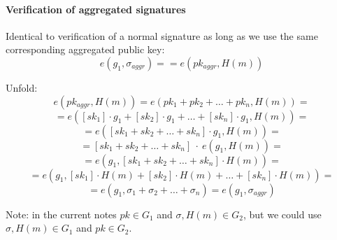 \documentclass{article}
\theoremstyle{definition}
\begin{document}
\paragraph{Verification of aggregated signatures}
Identical to verification of a normal signature as long as we use the same corresponding aggregated public key:
$$e(g_1, \sigma_{aggr})==e(pk_{aggr}, H(m))$$

Unfold:
$$e(pk_{aggr}, H(m))= e(pk_1 + pk_2 + \ldots + pk_n, H(m)) =$$
$$=e([sk_1] \cdot g_1 + [sk_2] \cdot g_1 + \ldots + [sk_n] \cdot g_1, H(m))=$$
$$=e([sk_1 + sk_2 + \ldots + sk_n] \cdot g_1, H(m))=$$
$$=[sk_1 + sk_2 + \ldots + sk_n]~\cdot~e(g_1, H(m))=$$
$$=e(g_1, [sk_1 + sk_2 + \ldots + sk_n] \cdot H(m))=$$
$$=e(g_1, [sk_1] \cdot H(m) + [sk_2] \cdot H(m) + \ldots + [sk_n] \cdot H(m))=$$
$$=e(g_1, \sigma_1 + \sigma_2 + \ldots + \sigma_n)= e(g_1, \sigma_{aggr})$$


Note: in the current notes $pk \in G_1$ and $\sigma, H(m) \in G_2$, but we could use $\sigma, H(m) \in G_1$ and $pk \in G_2$.



\end{document}
